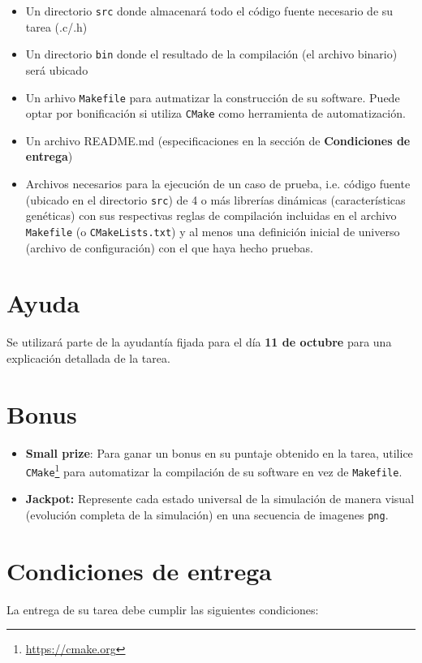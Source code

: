 \documentclass[letterpaper,10pt]{article}
\begin{document}
\begin{itemize}
    \item Un directorio \texttt{src} donde almacenará todo el código fuente necesario de su tarea (.c/.h)
    \item Un directorio \texttt{bin} donde el resultado de la compilación (el archivo binario) será ubicado
    \item Un arhivo \texttt{Makefile} para autmatizar la construcción de su software. Puede optar por bonificación si utiliza \texttt{CMake} como herramienta de automatización.
    \item Un archivo README.md (especificaciones en la sección de \textbf{Condiciones de entrega})
    \item Archivos necesarios para la ejecución de un caso de prueba, i.e. código fuente (ubicado en el directorio \texttt{src}) de 4 o más librerías dinámicas (características genéticas) con sus respectivas reglas de compilación incluidas en el archivo \texttt{Makefile} (o \texttt{CMakeLists.txt}) y al menos una definición inicial de universo (archivo de configuración) con el que haya hecho pruebas.
\end{itemize}

\section{Ayuda}
Se utilizará parte de la ayudantía fijada para el día \textbf{11 de octubre} para una explicación detallada de la tarea.

\section{Bonus}
\begin{itemize}
	\item \textbf{Small prize}: Para ganar un bonus en su puntaje obtenido en la tarea, utilice \texttt{CMake}\footnote{\href{https://cmake.org}{https://cmake.org}} para automatizar la compilación de su software en vez de \texttt{Makefile}.
	\item \textbf{Jackpot:} Represente cada estado universal de la simulación de manera visual (evolución completa de la simulación) en una secuencia de imagenes \texttt{png}.
\end{itemize}

\pagebreak

\section{Condiciones de entrega}
La entrega de su tarea debe cumplir las siguientes condiciones:
\end{document}
